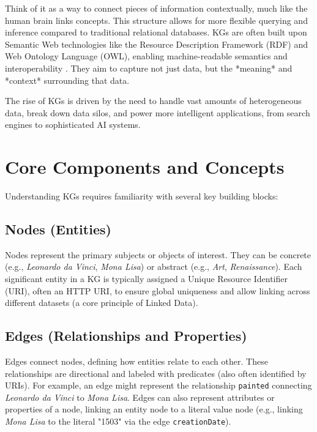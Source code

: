 \documentclass[11pt, a4paper]{article}
\begin{document}
Think of it as a way to connect pieces of information contextually, much like the human brain links concepts. This structure allows for more flexible querying and inference compared to traditional relational databases. KGs are often built upon Semantic Web technologies like the Resource Description Framework (RDF) and Web Ontology Language (OWL), enabling machine-readable semantics and interoperability \cite{BernersLee2001}. They aim to capture not just data, but the *meaning* and *context* surrounding that data.

The rise of KGs is driven by the need to handle vast amounts of heterogeneous data, break down data silos, and power more intelligent applications, from search engines \cite{GoogleKG} to sophisticated AI systems.

\section{Core Components and Concepts}
\label{sec:core_components}

Understanding KGs requires familiarity with several key building blocks:

\subsection{Nodes (Entities)}
\label{subsec:nodes}
Nodes represent the primary subjects or objects of interest. They can be concrete (e.g., \textit{Leonardo da Vinci}, \textit{Mona Lisa}) or abstract (e.g., \textit{Art}, \textit{Renaissance}). Each significant entity in a KG is typically assigned a Unique Resource Identifier (URI), often an HTTP URI, to ensure global uniqueness and allow linking across different datasets (a core principle of Linked Data).

\subsection{Edges (Relationships and Properties)}
\label{subsec:edges}
Edges connect nodes, defining how entities relate to each other. These relationships are directional and labeled with predicates (also often identified by URIs). For example, an edge might represent the relationship \texttt{painted} connecting \textit{Leonardo da Vinci} to \textit{Mona Lisa}. Edges can also represent attributes or properties of a node, linking an entity node to a literal value node (e.g., linking \textit{Mona Lisa} to the literal "1503" via the edge \texttt{creationDate}).
\end{document}
